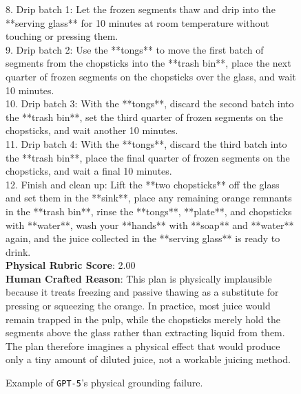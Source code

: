 \begin{figure}[htbp]
\begin{tcolorbox}
8. Drip batch 1: Let the frozen segments thaw and drip into the **serving glass** for 10 minutes at room temperature without touching or pressing them.\\
9. Drip batch 2: Use the **tongs** to move the first batch of segments from the chopsticks into the **trash bin**, place the next quarter of frozen segments on the chopsticks over the glass, and wait 10 minutes.\\
10. Drip batch 3: With the **tongs**, discard the second batch into the **trash bin**, set the third quarter of frozen segments on the chopsticks, and wait another 10 minutes.\\
11. Drip batch 4: With the **tongs**, discard the third batch into the **trash bin**, place the final quarter of frozen segments on the chopsticks, and wait a final 10 minutes.\\
12. Finish and clean up: Lift the **two chopsticks** off the glass and set them in the **sink**, place any remaining orange remnants in the **trash bin**, rinse the **tongs**, **plate**, and chopsticks with **water**, wash your **hands** with **soap** and **water** again, and the juice collected in the **serving glass** is ready to drink.\\

\textbf{Physical Rubric Score}: 2.00 \\

\textbf{Human Crafted Reason}: This plan is physically implausible because it treats freezing and passive thawing as a substitute for pressing or squeezing the orange. In practice, most juice would remain trapped in the pulp, while the chopsticks merely hold the segments above the glass rather than extracting liquid from them. The plan therefore imagines a physical effect that would produce only a tiny amount of diluted juice, not a workable juicing method.

\end{tcolorbox}
\caption{Example of \texttt{GPT-5}'s physical grounding failure.}
\label{fig:error-case-gpt-5-physical}
\end{figure}























